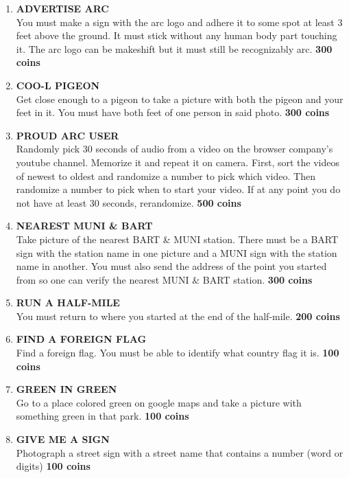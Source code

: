 \documentclass{article}
\begin{document}
\begin{enumerate}
    \item \textbf{ADVERTISE ARC} \\ You must make a sign with the arc logo and adhere it to some spot at least 3 feet above the ground. It must stick without any human body part touching it. The arc logo can be makeshift but it must still be recognizably arc. \textbf{300 coins}
    \item \textbf{COO-L PIGEON} \\ Get close enough to a pigeon to take a picture with both the pigeon and your feet in it. You must have both feet of one person in said photo. \textbf{300 coins}
    \item \textbf{PROUD ARC USER} \\ Randomly pick 30 seconds of audio from a video on the browser company's youtube channel. Memorize it and repeat it on camera. First, sort the videos of newest to oldest and randomize a number to pick which video. Then randomize a number to pick when to start your video. If at any point you do not have at least 30 seconds, rerandomize. \textbf{500 coins}
    \item \textbf{NEAREST MUNI \& BART} \\ Take picture of the nearest BART \& MUNI station. There must be a BART sign with the station name in one picture and a MUNI sign with the station name in another. You must also send the address of the point you started from so one can verify the nearest MUNI \& BART station. \textbf{300 coins}
    \item \textbf{RUN A HALF-MILE} \\ You must return to where you started at the end of the half-mile. \textbf{200 coins}
    \item \textbf{FIND A FOREIGN FLAG} \\ Find a foreign flag. You must be able to identify what country flag it is. \textbf{100 coins}
    \item \textbf{GREEN IN GREEN} \\ Go to a place colored green on google maps and take a picture with something green in that park. \textbf{100 coins}
    \item \textbf{GIVE ME A SIGN} \\ Photograph a street sign with a street name that contains a number (word or digits) \textbf{100 coins}

\end{enumerate}
\end{document}
